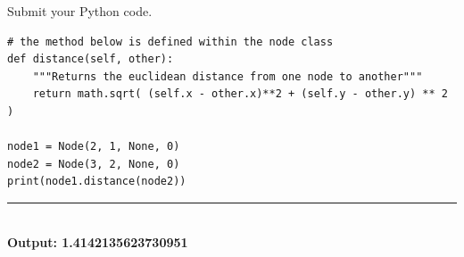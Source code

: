 \documentclass{article}
\begin{document}
\noindent Submit your Python code.
\begin{verbatim}
# the method below is defined within the node class
def distance(self, other):
    """Returns the euclidean distance from one node to another"""
    return math.sqrt( (self.x - other.x)**2 + (self.y - other.y) ** 2 )

node1 = Node(2, 1, None, 0)
node2 = Node(3, 2, None, 0)
print(node1.distance(node2))
\end{verbatim}

\noindent\rule{\textwidth}{0.4pt}\\
\textbf{Output: 1.4142135623730951}
\end{document}
